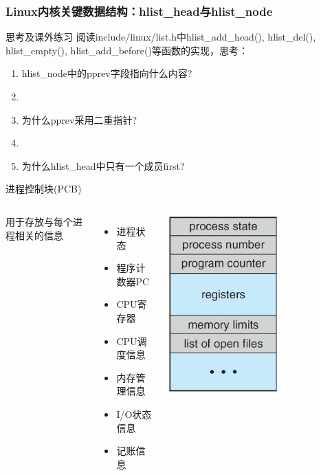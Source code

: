 \documentclass[xcolor=svgnames]{beamer}
\begin{document}
\begin{CJK*}{UTF8}{gbsn}
\begin{frame}%
\frametitle{Linux内核关键数据结构：hlist\_head与hlist\_node}
\begin{block}{思考及课外练习}
阅读include/linux/list.h中\alert{hlist\_add\_head}(), \alert{hlist\_del}(), \alert{hlist\_empty}(),
\alert{hlist\_add\_before}()等函数的实现，思考：

\begin{enumerate}
\item hlist\_node中的pprev字段指向什么内容?
\item[]
\item 为什么pprev采用二重指针?
\item[]
\item 为什么hlist\_head中只有一个成员first?
\end{enumerate}
\end{block}
\end{frame}

\begin{frame}{进程控制块(PCB)}
\begin{columns}%
用于存放与每个进程相关的信息
\begin{itemize}
\item 进程状态
\item 程序计数器PC
\item CPU寄存器
\item CPU调度信息
\item 内存管理信息
\item I/O状态信息
\item 记账信息
\end{itemize}
\includegraphics[width=0.6\textwidth]{PCB.png}
\end{columns}%
\end{frame}


\end{CJK*}
\end{document}
